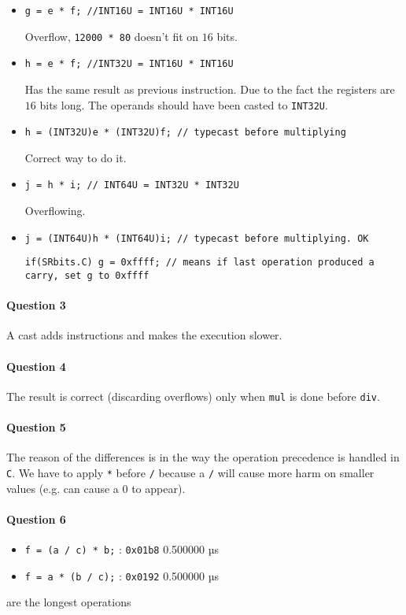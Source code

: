 \documentclass[10pt]{article}
\begin{document}
\begin{itemize}
\begin{itemize}
	\item \verb!g = e * f; //INT16U = INT16U * INT16U!

	Overflow, \verb!12000 * 80! doesn't fit on $16$ bits.

	\item \verb!h = e * f; //INT32U = INT16U * INT16U!

	Has the same result as previous instruction. Due to the fact the registers are $16$ bits long. The operands should have been casted to \verb!INT32U!.

	\item \verb!h = (INT32U)e * (INT32U)f; // typecast before multiplying!

	Correct way to do it.

	\item \verb!j = h * i; // INT64U = INT32U * INT32U!

	Overflowing.

	\item \verb!j = (INT64U)h * (INT64U)i; // typecast before multiplying. OK!

	\verb!if(SRbits.C) g = 0xffff; // means if last operation produced a carry, set g to 0xffff!

	\end{itemize}
\end{itemize}

\paragraph{Question 3}
A cast adds instructions and makes the execution slower.

\paragraph{Question 4}
The result is correct (discarding overflows) only when \verb!mul! is done before \verb!div!.

\paragraph{Question 5}
The reason of the differences is in the way the operation precedence is handled in \verb!C!.
We have to apply \verb!*! before \verb!/! because a \verb!/! will cause more harm on smaller values (e.g. can cause a $0$ to appear).

\paragraph{Question 6}
\begin{itemize}
\item \verb!f = (a / c) * b;! : \verb!0x01b8! 0.500000 µs
\item \verb!f = a * (b / c);! : \verb!0x0192! 0.500000 µs
\end{itemize}
are the longest operations
\end{document}
